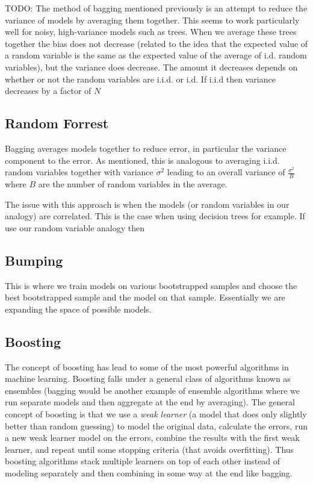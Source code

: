 TODO: The method of bagging mentioned previously is an attempt to reduce the variance of models by averaging them together. This seems to work particularly well for noisy, high-variance models such as trees. When we average these trees together the bias does not decrease (related to the idea that the expected value of a random variable is the same as the expected value of the average of i.d. random variables), but the variance does decrease. The amount it decreases depends on whether or not the random variables are i.i.d. or i.d. If i.i.d then variance decreases by a factor of $N$

\subsection{Random Forrest}

Bagging averages models together to reduce error, in particular the variance component to the error. As mentioned, this is analogous to averaging i.i.d. random variables together with variance $\sigma^2$ leading to an overall variance of $\frac{\sigma^2}{B}$ where $B$ are the number of random variables in the average. 

The issue with this approach is when the models (or random variables in our analogy) are correlated. This is the case when using decision trees for example. If use our random variable analogy then 



\subsection{Bumping}
This is where we train models on various bootstrapped samples and choose the best bootstrapped sample and the model on that sample. Essentially we are expanding the space of possible models.

\subsection{Boosting}

The concept of boosting has lead to some of the most powerful algorithms in machine learning. Boosting falls under a general class of algorithms known as ensembles (bagging would be another example of ensemble algorithms where we run separate models and then aggregate at the end by averaging). The general concept of boosting is that we use a \emph{weak learner} (a model that does only slightly better than random guessing) to model the original data, calculate the errors, run a new weak learner model on the errors, combine the results with the first weak learner, and repeat until some stopping criteria (that avoids overfitting). Thus boosting algorithms stack multiple learners on top of each other instead of modeling separately and then combining in some way at the end like bagging.

